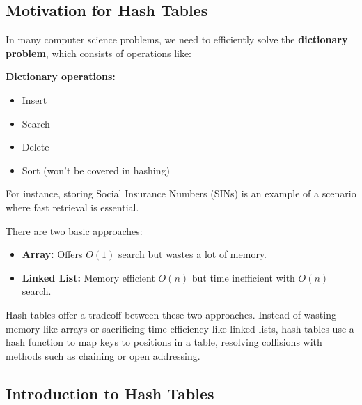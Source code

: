 \subsection{Motivation for Hash Tables}
\begin{intuition}
    In many computer science problems, we need to efficiently solve the \textbf{dictionary problem}, which consists of operations like:
    \vspace{1em}

    \textbf{Dictionary operations:}
    \begin{itemize}
        \item Insert
        \item Search
        \item Delete
        \item Sort (won't be covered in hashing)
    \end{itemize}
    \vspace{1em}

    For instance, storing Social Insurance Numbers (SINs) is an example of a scenario where fast retrieval is essential.

    There are two basic approaches:
    \begin{itemize}
        \item \textbf{Array:} Offers \( O(1) \) search but wastes a lot of memory.
        \item \textbf{Linked List:} Memory efficient $O(n)$ but time inefficient with \( O(n) \) search.
    \end{itemize}

    \vspace{1em}

    Hash tables offer a tradeoff between these two approaches. Instead of wasting memory like arrays or sacrificing time efficiency like linked lists, hash tables use a hash function to map keys to positions in a table, resolving collisions with methods such as chaining or open addressing.
\end{intuition}

\subsection{Introduction to Hash Tables}

